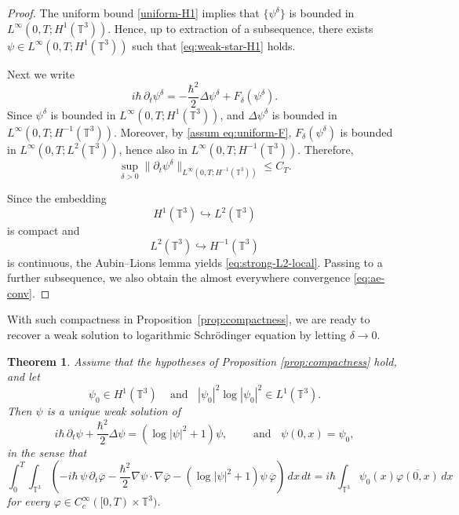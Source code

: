 \documentclass[11pt]{article}
\newtheorem{theorem}{Theorem}
\begin{document}
\begin{proof}
The uniform bound \eqref{uniform-H1} implies that \(\{\psi^\delta\}\) is bounded in
\(L^\infty(0,T;H^1(\mathbb{T}^3))\). Hence, up to extraction of a subsequence, there exists
\(\psi\in L^\infty(0,T;H^1(\mathbb{T}^3))\) such that \eqref{eq:weak-star-H1} holds.

Next we write 
\[
i\hbar\,\partial_t\psi^\delta
=
-\frac{\hbar^2}{2}\Delta\psi^\delta + F_\delta(\psi^\delta).
\]
Since \(\psi^\delta\) is bounded in
\(L^\infty(0,T;H^1(\mathbb{T}^3))\), and \(\Delta\psi^\delta\) is bounded in
\(L^\infty(0,T;H^{-1}(\mathbb{T}^3))\). Moreover, by \eqref{assum eq:uniform-F},
\(F_\delta(\psi^\delta)\) is bounded in \(L^\infty(0,T;L^2(\mathbb{T}^3))\), hence also in
\(L^\infty(0,T;H^{-1}(\mathbb{T}^3))\). Therefore,
\[
\sup_{\delta>0}\|\partial_t\psi^\delta\|_{L^\infty(0,T;H^{-1}(\mathbb{T}^3))}\le C_{T}.
\]

Since the embedding
\[
H^1(\mathbb{T}^3)\hookrightarrow L^2(\mathbb{T}^3)
\]
is compact and
\[
L^2(\mathbb{T}^3)\hookrightarrow H^{-1}(\mathbb{T}^3)
\]
is continuous, the Aubin--Lions lemma yields \eqref{eq:strong-L2-local}. Passing to a further subsequence, we also obtain the almost everywhere convergence \eqref{eq:ae-conv}.
\end{proof}






With such compactness in Proposition~\ref{prop:compactness},  we are ready to recover a weak solution to  logarithmic Schr\"odinger equation by letting $\delta\to 0.$




\begin{theorem}
\label{weak solution to log SE}
Assume that the hypotheses of Proposition \ref{prop:compactness} hold, and let \[\psi_0\in H^1(\mathbb{T}^3)\;\;\;\text{ and }\;\; 
|\psi_0|^2\log|\psi_0|^2\in L^1(\mathbb{T}^3). 
\]
Then  \(\psi\) is a unique weak solution of
\begin{equation}\label{eq:logNLS-limit}
i\hbar\,\partial_t\psi+\frac{\hbar^2}{2}\Delta\psi
=
(\log|\psi|^2+1)\psi,\quad\quad\text{ and }\;\; \psi(0,x)=\psi_0,
\end{equation}
in the sense that
\begin{equation}\label{eq:weak-form-limit}
\int_0^T\!\!\int_{\mathbb{T}^3}
\left(
-i\hbar\,\psi\,\partial_t\overline{\varphi}
-\frac{\hbar^2}{2}\nabla\psi\cdot\nabla\overline{\varphi}
-(\log|\psi|^2+1)\psi\,\overline{\varphi}
\right)\,dx\,dt
=
i\hbar\int_{\mathbb{T}^3}\psi_0(x)\overline{\varphi(0,x)}\,dx
\end{equation}
for every \(\varphi\in C_c^\infty([0,T)\times\mathbb{T}^3)\).
\end{theorem}
\end{document}
